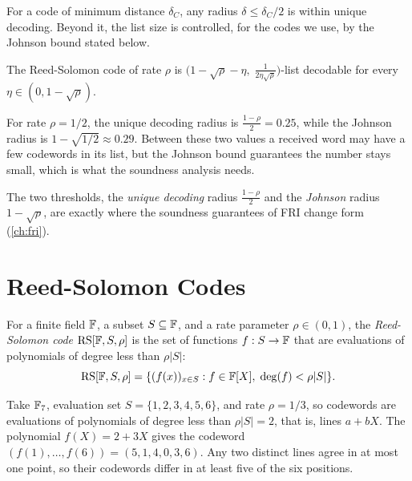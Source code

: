 For a code of minimum distance $\delta_C$, any radius
$\delta \leq \delta_C/2$ is within unique decoding. Beyond it, the list
size is controlled, for the codes we use, by the Johnson bound stated
below.

\begin{theorem}
\label{thm:johnson}
The Reed-Solomon code of rate $\rho$ is
$\bigl(1 - \sqrt{\rho} - \eta,\; \tfrac{1}{2\eta\sqrt{\rho}}\bigr)$-list
decodable for every $\eta \in (0, 1 - \sqrt{\rho})$.
\end{theorem}

\begin{example}
\label{ex:johnson}
For rate $\rho = 1/2$, the unique decoding radius is
$\tfrac{1-\rho}{2} = 0.25$, while the Johnson radius is
$1 - \sqrt{1/2} \approx 0.29$. Between these two values a received word
may have a few codewords in its list, but the Johnson bound guarantees
the number stays small, which is what the soundness analysis needs.
\end{example}

The two thresholds, the \emph{unique decoding} radius
$\tfrac{1-\rho}{2}$ and the \emph{Johnson} radius $1 - \sqrt{\rho}$,
are exactly where the soundness guarantees of FRI change form
(\cref{ch:fri}).

\section{Reed-Solomon Codes}
\label{sec:reed_solomon}

\begin{definition}
\label{def:rs_code}
For a finite field $\mathbb{F}$, a subset $S \subseteq \mathbb{F}$, and a rate
parameter $\rho \in (0,1)$, the \emph{Reed-Solomon code}
$\mathrm{RS}[\mathbb{F}, S, \rho]$ is the set of functions $f : S \to \mathbb{F}$ that are
evaluations of polynomials of degree less than $\rho|S|$:
%
\[
\mathrm{RS}[\mathbb{F}, S, \rho] = \{(f(x))_{x \in S} : f \in \mathbb{F}[X],\;
  \deg(f) < \rho|S|\}.
\]
\end{definition}

\begin{example}
\label{ex:rs_code}
Take $\mathbb{F}_7$, evaluation set $S = \{1,2,3,4,5,6\}$, and rate
$\rho = 1/3$, so codewords are evaluations of polynomials of degree
less than $\rho|S| = 2$, that is, lines $a + bX$. The polynomial
$f(X) = 2 + 3X$ gives the codeword
$(f(1),\ldots,f(6)) = (5, 1, 4, 0, 3, 6)$. Any two distinct lines agree
in at most one point, so their codewords differ in at least five of the
six positions.
\end{example}


